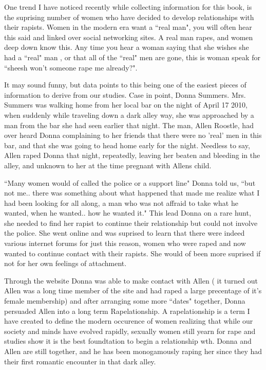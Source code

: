 
    One trend I have noticed recently while collecting information for this book, is the suprising number of women
who have decided to develop relationships with their rapists. Women in the modern era want a ``real man", you will often
hear this said and linked over social networking sites. A real man rapes, and women deep down know this. Any time you
hear a woman saying that she wishes she had a ``real" man , or that all of the ``real" men are gone, this is woman speak
for ``sheesh won't someone rape me already?".


        It may sound funny, but data points to this being one of the easiest pieces of information to derive from our studies.
Case in point, Donna Summers. Mrs. Summers was walking home from her local bar on the night of April 17 2010, when suddenly
while traveling down a dark alley way, she was approached by a man from the bar she had seen earlier that night. The man, Allen
Roostle, had over heard Donna complaining to her friends that there were no 'real' men in this bar, and that she was going
to head home early for the night. Needless to say, Allen raped Donna that night, repeatedly, leaving her beaten and bleeding
in the alley, and unknown to her at the time pregnant with Allens child.


        ``Many women would of called the police or a support line" Donna told us, ``but not me.. there was something about
what happened that made me realize what I had been looking for all along, a man who was not affraid to take what he wanted,
when he wanted.. how he wanted it." This lead Donna on a rare hunt, she needed to find her rapist to continue their relationship
but could not involve the police. She went online and was suprised to learn that there were indeed various internet forums
for just this reason, women who were raped and now wanted to continue contact with their rapists. She would of been more suprised
if not for her own feelings of attachment.


        Through the website Donna was able to make contact with Allen ( it turned out Allen was a long time member of the site
and had raped a large precentage of it's female membership) and after arranging some more ``dates" together, Donna persuaded Allen
into a long term Rapelationship. A rapelationship is a term I have created to define the modern occurence of women realizing
that while our society and minds have evolved rapidly, sexually women still yearn for rape and studies show it is the
best foundtation to begin a relationship wth. Donna and Allen are still together, and he has been monogamously raping her
since they had their first romantic encounter in that dark alley.


